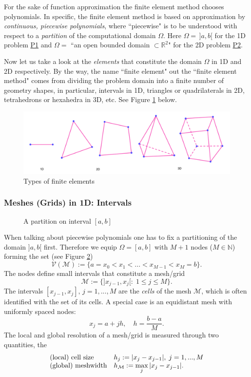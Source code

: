 	For the sake of function approximation the finite element method chooses
	polynomials. In specific, the finite element method is based on 
	approximation by \emph{continuous, piecewise polynomials}, where 
	``piecewise" is to be understood with respect to a \emph{partition} of the 
	computational domain $\Omega$. Here $\Omega=\,]a,b[$ for the 1D problem 
	\hyperlink{P1}{P1} and	$\Omega=$ ``an open bounded domain 
	$\subset \mathbb{R}^2$" for the 2D problem	\hyperlink{P2}{P2}.
	
	Now let	us take a look at the \emph{elements} that constitute the domain 
	$\Omega$ in 1D and 2D respectively. By the way, the name ``finite element"
	out the ``finite element method" comes from dividing the problem domain 
	into a finite number of geometry shapes, in particular, intervals in 1D, 
	triangles or quadrilaterals in 2D, tetrahedrons or hexahedra in 3D,
	etc. See Figure \ref{fig:types_of_FE} below.\vspace{-8pt}
	\begin{figure}[!htbp]
		\centering
		\includegraphics[width=0.7\linewidth]{svg/Types_of_FE}
		\caption{Types of finite elements}
		\label{fig:types_of_FE}
	\end{figure}
	
	\subsubsection{Meshes (Grids) in 1D: Intervals}
	\begin{figure}[!htbp]
		\centering		
		
		\caption{A partition on interval $[a,b]$}
		\label{tikz:1D_a_partition_on_interval_[a,b]}
	\end{figure}
	When talking about piecewise polynomials one has to fix a partitioning of 
	the domain $]a,b[$ first. Therefore we equip $\Omega=[a,b]$ with $M+1$ 
	nodes ($M\in \mathbb{N}$) forming the set (see Figure 
	\ref{tikz:1D_a_partition_on_interval_[a,b]})
	$$\mathcal{V}(\mathcal{M}):=\{a=x_0<x_1<...<x_{M-1}<x_M=b\}.$$
	The nodes define small intervals that constitute a mesh/grid
	$$\mathcal{M}:=\{]x_{j-1},x_j[:\; 1\leq j \leq M \}.$$		
	The intervals $[x_{j-1},x_j],\,j=1,...,M$ are the \emph{cells} of the 
	mesh $\mathcal{M}$, which is often identified with the set of its cells. 
	A special case is an equidistant mesh with uniformly spaced nodes:
	$$ x_j=a+jh,\quad h=\frac{b-a}{M}.$$		
	The local and global resolution of a mesh/grid is measured through two 
	quantities, the\[
	\begin{array}{lll@{}} %
	\textrm{(local) cell size}   &h_j:=|x_j-x_{j-1}|,\; j=1,...,M\\
	\textrm{(global) meshwidth}  &h_{\mathcal{M}}:=\displaystyle
													\max_j |x_j-x_{j-1}|.
	\end{array}\]

